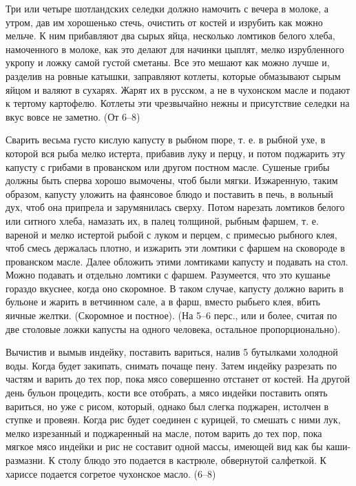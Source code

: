 
Три или четыре шотландских селедки должно намочить с вечера в молоке, а утром, дав им хорошенько стечь, очистить от костей и изрубить как можно мельче. К ним прибавляют два сырых яйца, несколько ломтиков белого хлеба, намоченного в молоке, как это делают для начинки цыплят, мелко изрубленного укропу и ложку самой густой сметаны. Все это мешают как можно лучше и, разделив на ровные катышки, заправляют котлеты, которые обмазывают сырым яйцом и валяют в сухарях. Жарят их в русском, а не в чухонском масле и подают к тертому картофелю. Котлеты эти чрезвычайно нежны и присутствие селедки на вкус вовсе не заметно. (От 6--8) 


Сварить весьма густо кислую капусту в рыбном пюре, т. е. в рыбной ухе, в которой вся рыба мелко истерта, прибавив луку и перцу, и потом поджарить эту капусту с грибами в прованском или другом постном масле. Сушеные грибы должны быть сперва хорошо вымочены, чтоб были мягки. Изжаренную, таким образом, капусту уложить на фаянсовое блюдо и поставить в печь, в вольный дух, чтоб она припрела и зарумянилась сверху. Потом нарезать ломтиков белого или ситного хлеба, намазать их, в палец толщиной, рыбным фаршем, т. е. вареной и мелко истертой рыбой с луком и перцем, с примесью рыбного клея, чтоб смесь держалась плотно, и изжарить эти ломтики с фаршем на сковороде в прованском масле. Далее обложить этими ломтиками капусту и подавать на стол. Можно подавать и отдельно ломтики с фаршем. Разумеется, что это кушанье гораздо вкуснее, когда оно скоромное. В таком случае, капусту должно варить в бульоне и жарить в ветчинном сале, а в фарш, вместо рыбьего клея, вбить яичные желтки. (Скоромное и постное). (На 5--6 перс., или и более, считая по две столовые ложки капусты на одного человека, остальное пропорционально). 


Вычистив и вымыв индейку, поставить вариться, налив 5 бутылками холодной воды. Когда будет закипать, снимать почаще пену. Затем индейку разрезать по частям и варить до тех пор, пока мясо совершенно отстанет от костей. На другой день бульон процедить, кости все отобрать, а мясо индейки поставить опять вариться, но уже с рисом, который, однако был слегка поджарен, истолчен в ступке и провеян. Когда рис будет соединен с курицей, то смешать с ними лук, мелко изрезанный и поджаренный на масле, потом варить до тех пор, пока мягкое мясо индейки и рис не составит одной массы, имеющей вид как бы каши-размазни. К столу блюдо это подается в кастрюле, обвернутой салфеткой. К хариссе подается согретое чухонское масло. (6--8) 

